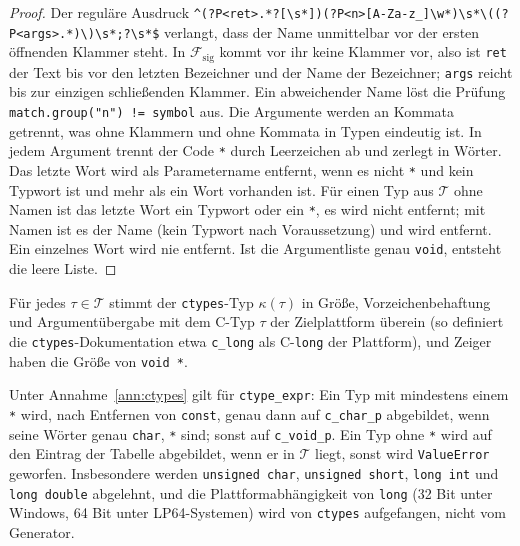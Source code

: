 \begin{proof}
	Der reguläre Ausdruck \texttt{\^{}(?P<ret>.*?[\textbackslash s*])(?P<n>[A-Za-z\_]\textbackslash w*)\textbackslash s*\textbackslash((?P<args>.*)\textbackslash)\textbackslash s*;?\textbackslash s*\$} verlangt, dass der Name unmittelbar vor der ersten öffnenden Klammer steht. In $\mathcal{F}_{\mathrm{sig}}$ kommt vor ihr keine Klammer vor, also ist \texttt{ret} der Text bis vor den letzten Bezeichner und der Name der Bezeichner; \texttt{args} reicht bis zur einzigen schließenden Klammer. Ein abweichender Name löst die Prüfung \texttt{match.group("n") != symbol} aus. Die Argumente werden an Kommata getrennt, was ohne Klammern und ohne Kommata in Typen eindeutig ist. In jedem Argument trennt der Code \texttt{*} durch Leerzeichen ab und zerlegt in Wörter. Das letzte Wort wird als Parametername entfernt, wenn es nicht \texttt{*} und kein Typwort ist und mehr als ein Wort vorhanden ist. Für einen Typ aus $\mathcal{T}$ ohne Namen ist das letzte Wort ein Typwort oder ein \texttt{*}, es wird nicht entfernt; mit Namen ist es der Name (kein Typwort nach Voraussetzung) und wird entfernt. Ein einzelnes Wort wird nie entfernt. Ist die Argumentliste genau \texttt{void}, entsteht die leere Liste.
\end{proof}

\begin{annahme}
	\label{ann:ctypes}
	Für jedes $\tau\in\mathcal{T}$ stimmt der \texttt{ctypes}-Typ $\kappa(\tau)$ in Größe, Vorzeichenbehaftung und Argumentübergabe mit dem C-Typ $\tau$ der Zielplattform überein (so definiert die \texttt{ctypes}-Dokumentation etwa \texttt{c\_long} als C-\texttt{long} der Plattform), und Zeiger haben die Größe von \texttt{void *}.
\end{annahme}

\begin{satz}[Typabbildung]
	\label{satz:typen}
	Unter Annahme~\ref{ann:ctypes} gilt für \texttt{ctype\_expr}: Ein Typ mit mindestens einem \texttt{*} wird, nach Entfernen von \texttt{const}, genau dann auf \texttt{c\_char\_p} abgebildet, wenn seine Wörter genau \texttt{char}, \texttt{*} sind; sonst auf \texttt{c\_void\_p}. Ein Typ ohne \texttt{*} wird auf den Eintrag der Tabelle abgebildet, wenn er in $\mathcal{T}$ liegt, sonst wird \texttt{ValueError} geworfen. Insbesondere werden \texttt{unsigned char}, \texttt{unsigned short}, \texttt{long int} und \texttt{long double} abgelehnt, und die Plattformabhängigkeit von \texttt{long} (32 Bit unter Windows, 64 Bit unter LP64-Systemen) wird von \texttt{ctypes} aufgefangen, nicht vom Generator.
\end{satz}

